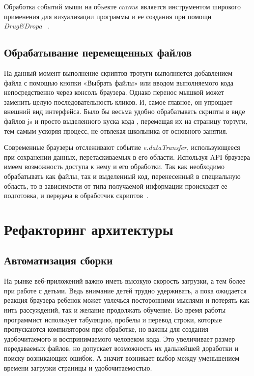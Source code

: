 Обработка событий мыши на объекте canvas является инструментом  широкого применения для визуализации программы и ее создания при помощи \textit{Drug\&Dropa} ~\cite{mouseev1, mouseev2, mouseev3}.


\section{Обрабатывание перемещенных файлов} \label{sect1_1}
На данный момент выполнение скриптов тротуги выполняется добавлением файла с помощью кнопки «Выбрать файлы» или вводом выполняемого кода непосредственно через консоль браузера. Однако перенос мышкой может заменить целую последовательность кликов. И, самое главное, он упрощает внешний вид интерфейса. Было бы весьма удобно обрабатывать скрипты в виде файлов js и просто выделенного куска кода , перемещая их  на страницу тортуги, тем самым ускоряя процесс, не отвлекая школьника от основного занятия.

Современные браузеры отслеживают событие \textit{e.dataTransfer}, использующееся при сохранении данных, перетаскиваемых в его области. Используя API браузера имеем возможность доступа к нему и его обработки. Так как необходимо обрабатывать как файлы, так и выделенный код, перенесенный в специальную область, то в зависимости от типа получаемой информации  происходит ее подготовка, и передача в обработчик скриптов~\cite{brouseev1, brouseev2, brouseev3, brouseev4}.

\chapter{Рефакторинг архитектуры} \label{chapt1}


\section{Автоматизация сборки} \label{sect1_1}

На рынке веб-приложений важно иметь высокую скорость загрузки, а тем более при работе с детьми. Ведь внимание детей трудно удерживать, а пока ожидается реакция браузера ребенок может увлечься посторонними мыслями и потерять как нить рассуждений, так и желание продолжать обучение. 
Во время работы программист использует табуляцию, пробелы и перевод строки, которые пропускаются компилятором при обработке, но важны для создания удобочитаемого и воспринимаемого человеком кода. Это увеличивает размер передаваемых файлов, но допускает возможность их дальнейшей доработки и поиску возникающих ошибок. А значит возникает выбор между уменьшением времени загрузки страницы и удобочитаемостью.

